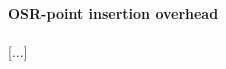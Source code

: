 \ifauthorea{\newline}{}
\paragraph{OSR-point insertion overhead}
[...]
  

  
  
  
  
  
  
  
  
  
  
  
  
  
  
  
  